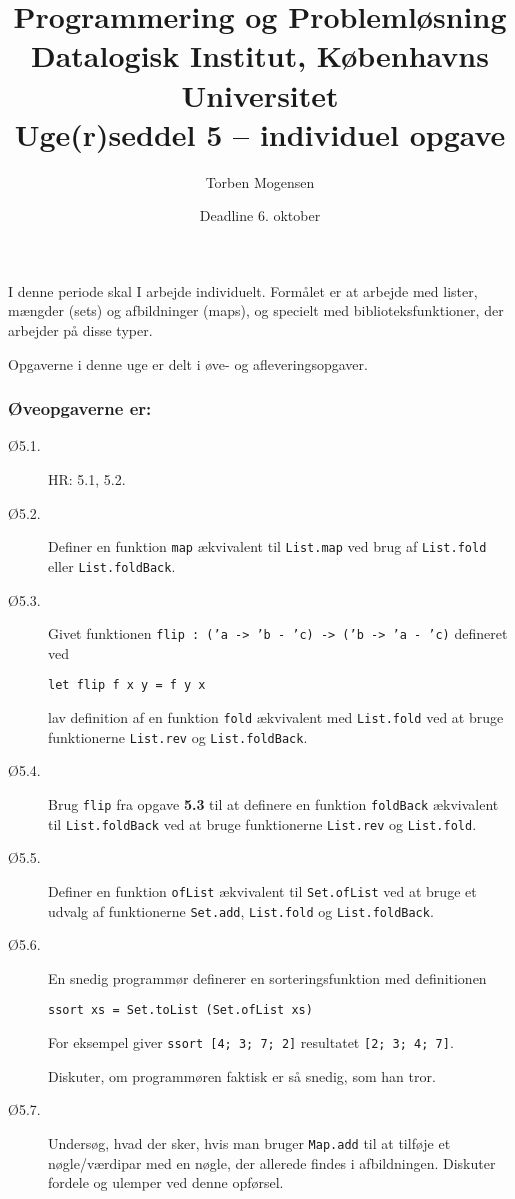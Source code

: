 \documentclass[a4paper]{article}
\begin{document}
\title{Programmering og Problemløsning\\
Datalogisk Institut, Københavns Universitet\\
Uge(r)seddel 5 -- individuel opgave}

\author{Torben Mogensen}
\date{Deadline 6. oktober}

\maketitle

\noindent
I denne periode skal I arbejde individuelt.  Formålet er at arbejde
med lister, mængder (sets) og afbildninger (maps), og specielt med
biblioteksfunktioner, der arbejder på disse typer.

Opgaverne i denne uge er delt i øve- og afleveringsopgaver.

\subsubsection*{Øveopgaverne er:}

\begin{description}
\item[Ø5.1.] HR: 5.1, 5.2.

\item[Ø5.2.] Definer en funktion \texttt{map} ækvivalent til
  \texttt{List.map} ved brug af \texttt{List.fold} eller
  \texttt{List.foldBack}.

\item[Ø5.3.] Givet funktionen \texttt{flip : ('a -> 'b - 'c) -> ('b -> 'a
  - 'c)} defineret ved

\texttt{let flip f x y = f y x}

lav definition af en funktion \texttt{fold} ækvivalent med
\texttt{List.fold} ved at bruge funktionerne \texttt{List.rev} og
\texttt{List.foldBack}.

\item[Ø5.4.] Brug \texttt{flip} fra opgave \textbf{5.3} til at definere
  en funktion \texttt{foldBack} ækvivalent til \texttt{List.foldBack}
  ved at bruge funktionerne \texttt{List.rev} og \texttt{List.fold}.

\item[Ø5.5.]  Definer en funktion \texttt{ofList} ækvivalent til
  \texttt{Set.ofList} ved at bruge et udvalg af funktionerne
  \texttt{Set.add}, \texttt{List.fold} og \texttt{List.foldBack}.

\item[Ø5.6.] En snedig programmør definerer en sorteringsfunktion med
  definitionen

\texttt{ssort xs = Set.toList (Set.ofList xs)}

For eksempel giver \texttt{ssort [4; 3; 7; 2]} resultatet \texttt{[2;
    3; 4; 7]}.

Diskuter, om programmøren faktisk er så snedig, som han tror.

\item[Ø5.7.] Undersøg, hvad der sker, hvis man bruger \texttt{Map.add}
  til at tilføje et nøgle/værdipar med en nøgle, der allerede findes i
  afbildningen.  Diskuter fordele og ulemper ved denne opførsel.

\end{description}
\end{document}
